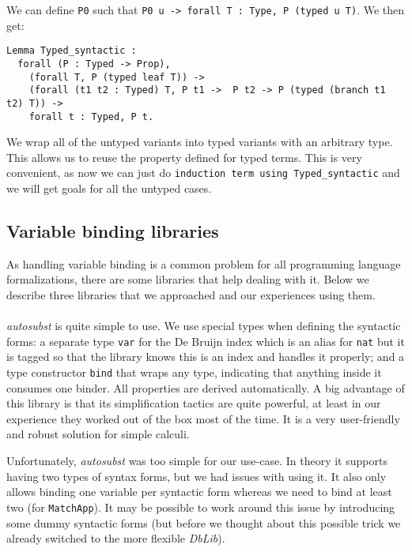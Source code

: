 \documentclass[runningheads]{article}
\begin{document}
We can define \texttt{P0} such that \texttt{P0 u -> forall T : Type, P (typed u T)}. We then get:

\begin{lstlisting}
Lemma Typed_syntactic :
  forall (P : Typed -> Prop),
    (forall T, P (typed leaf T)) ->
    (forall (t1 t2 : Typed) T, P t1 ->  P t2 -> P (typed (branch t1 t2) T)) ->
    forall t : Typed, P t.
\end{lstlisting}

We wrap all of the untyped variants into typed variants with an arbitrary type. This allows us to reuse the property defined for typed terms. This is very convenient, as now we can just do \texttt{induction term using Typed\_syntactic} and we will get goals for all the untyped cases.

\subsection{Variable binding libraries}
\label{binderlibs}

As handling variable binding is a common problem for all programming language formalizations, there are some libraries that help dealing with it. Below we describe three libraries that we approached and our experiences using them.

\paragraph{}

\textit{autosubst} \cite{autosubst} is quite simple to use. We use special types when defining the syntactic forms: a separate type \verb|var| for the De Bruijn index which is an alias for \verb|nat| but it is tagged so that the library knows this is an index and handles it properly; and a type constructor \verb|bind| that wraps any type, indicating that anything inside it consumes one binder. All properties are derived automatically. A big advantage of this library is that its simplification tactics are quite powerful, at least in our experience they worked out of the box most of the time. It is a very user-friendly and robust solution for simple calculi.

Unfortunately, \textit{autosubst} was too simple for our use-case. In theory it supports having two types of syntax forms, but we had issues with using it. It also only allows binding one variable per syntactic form whereas we need to bind at least two (for \verb|MatchApp|). It may be possible to work around this issue by introducing some dummy syntactic forms (but before we thought about this possible trick we already switched to the more flexible \textit{DbLib}).
\end{document}
